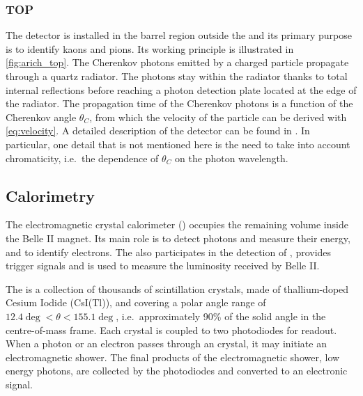 \subsubsection*{TOP}
The \TOP detector is installed in the barrel region outside the \CDC and its primary purpose is to identify kaons and pions.
Its working principle is illustrated in \cref{fig:arich_top}.
The Cherenkov photons emitted by a charged particle propagate through a quartz radiator.
The photons stay within the radiator thanks to total internal reflections before reaching a photon detection plate located at the edge of the radiator.
The propagation time of the Cherenkov photons is a function of the Cherenkov angle $\theta_C$, from which the velocity of the particle can be derived with \cref{eq:velocity}.
A detailed description of the \TOP detector can be found in \cite{Inami2008}.
In particular, one detail that is not mentioned here is the need to take into account chromaticity, i.e.~the dependence of $\theta_C$ on the photon wavelength.

\subsection{Calorimetry}

The electromagnetic crystal calorimeter (\ECL) occupies the remaining volume inside the Belle II magnet.
Its main role is to detect photons and measure their energy, and to identify electrons.
The \ECL also participates in the detection of \KL, provides trigger signals and is used to measure the luminosity received by Belle II.

The \ECL is a collection of thousands of scintillation crystals, made of thallium-doped Cesium Iodide (CsI(Tl)), and covering a polar angle range of $12.4\deg<\theta<155.1\deg$, i.e.~approximately 90\% of the solid angle in the centre-of-mass frame.
Each crystal is coupled to two photodiodes for readout.
When a photon or an electron passes through an \ECL crystal, it may initiate an electromagnetic shower.
The final products of the electromagnetic shower, low energy photons, are collected by the photodiodes and converted to an electronic signal.

